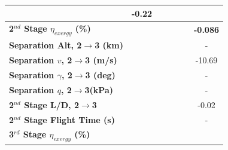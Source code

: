 \begin{table}[ht!]
\begin{tabular}{l c c c c c c}
		&-0.22
		\\
		\hline 
		\textbf{2$^{nd}$ Stage $\eta_{exergy}$ (\%)}
		& \textbf{\secondExergyEffCdNinetyNoReturn}
		& \textbf{\secondExergyEffCdNinetyFiveNoReturn}
		& \textbf{\secondExergyEffCdStandardNoReturn}
		& \textbf{\secondExergyEffCdOneHundredFiveNoReturn}
		& \textbf{\secondExergyEffCdOneHundredTenNoReturn}
		& \textbf{-0.086}
		\\
		\textbf{Separation Alt, 2$\rightarrow$3 (km)}
		& \secondthirdSeparationAltCdNinetyNoReturn
		& \secondthirdSeparationAltCdNinetyFiveNoReturn
		& \secondthirdSeparationAltCdStandardNoReturn
		& \secondthirdSeparationAltCdOneHundredFiveNoReturn
		& \secondthirdSeparationAltCdOneHundredTenNoReturn
		& -
		\\
		\textbf{Separation $v$, 2$\rightarrow$3 (m/s)}
		& \secondthirdSeparationvCdNinetyNoReturn
		& \secondthirdSeparationvCdNinetyFiveNoReturn
		& \secondthirdSeparationvCdStandardNoReturn
		& \secondthirdSeparationvCdOneHundredFiveNoReturn
		& \secondthirdSeparationvCdOneHundredTenNoReturn
		&-10.69
		\\
		\textbf{Separation $\gamma$, 2$\rightarrow$3 (deg)}
		& \secondthirdSeparationgammaCdNinetyNoReturn
		& \secondthirdSeparationgammaCdNinetyFiveNoReturn
		& \secondthirdSeparationgammaCdStandardNoReturn
		& \secondthirdSeparationgammaCdOneHundredFiveNoReturn
		& \secondthirdSeparationgammaCdOneHundredTenNoReturn
		& -
		\\
		\textbf{Separation $q$, 2$\rightarrow$3(kPa)}
		& \secondthirdSeparationqCdNinetyNoReturn
		& \secondthirdSeparationqCdNinetyFiveNoReturn
		& \secondthirdSeparationqCdStandardNoReturn
		& \secondthirdSeparationqCdOneHundredFiveNoReturn
		& \secondthirdSeparationqCdOneHundredTenNoReturn
		& -
		\\
		\textbf{2$^{nd}$ Stage L/D, 2$\rightarrow$3}
		& \secondthirdSeparationLDCdNinetyNoReturn
		& \secondthirdSeparationLDCdNinetyFiveNoReturn
		& \secondthirdSeparationLDCdStandardNoReturn
		& \secondthirdSeparationLDCdOneHundredFiveNoReturn
		& \secondthirdSeparationLDCdOneHundredTenNoReturn
		&-0.02
		\\
		\textbf{2$^{nd}$ Stage Flight Time (s)}
		& \secondFlightTimeCdNinetyNoReturn
		& \secondFlightTimeCdNinetyFiveNoReturn
		& \secondFlightTimeCdStandardNoReturn
		& \secondFlightTimeCdOneHundredFiveNoReturn
		& \secondFlightTimeCdOneHundredTenNoReturn
		& -
		\\
		\hline 
		\textbf{3$^{rd}$ Stage $\eta_{exergy}$ (\%)}
		& \textbf{\thirddExergyEffCdNinetyNoReturn}
		& \textbf{\thirddExergyEffCdNinetyFiveNoReturn}

\end{tabular}
\end{table}
